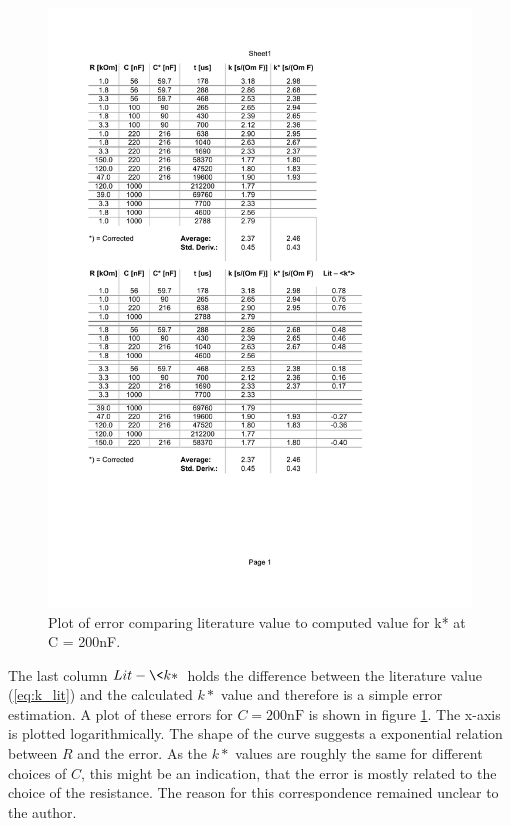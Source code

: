 \documentclass[journal]{IEEEtran}
\begin{document}
\begin{figure}
  \centering
   \includegraphics[trim=50mm 90mm 45mm 125mm, clip,
   width=\columnwidth,page=2]{results/am_data.pdf}
   \caption{Plot of error comparing literature value to computed value for k* at
   C = 200nF.}
   \label{fig:am_plot}
\end{figure}

The last column $Lit - \<k*\>$ holds the difference between the literature value
(\ref{eq:k_lit}) and the calculated $k*$ value and therefore is a simple error
estimation. A plot of these errors for $C = 200\text{nF}$ is shown in figure
\ref{fig:am_plot}. The x-axis is plotted logarithmically. The shape of the curve
suggests a exponential relation between $R$ and the error. As the $k*$ values
are roughly the same for different choices of $C$, this might be an indication,
that the error is mostly related to the choice of the resistance. The reason for
this correspondence remained unclear to the author.
\end{document}
